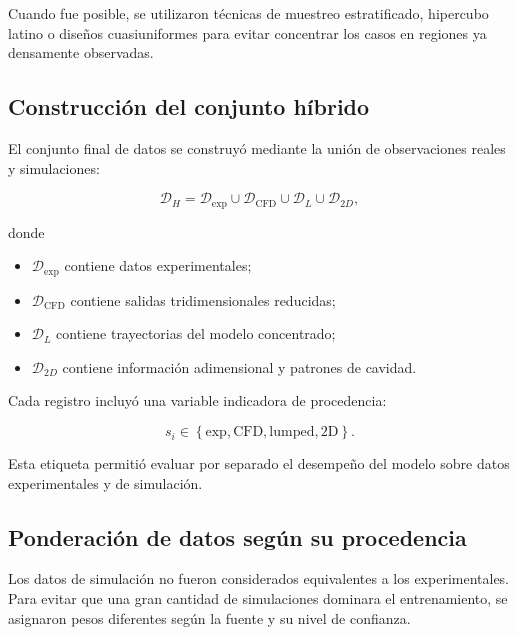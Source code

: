Cuando fue posible, se utilizaron técnicas de muestreo estratificado, hipercubo latino o diseños cuasiuniformes para evitar concentrar los casos en regiones ya densamente observadas.

\subsection{Construcción del conjunto híbrido}
\label{subsec:conjunto_hibrido}

El conjunto final de datos se construyó mediante la unión de observaciones reales y simulaciones:

\begin{equation}
\mathcal{D}_{H}
=
\mathcal{D}_{\mathrm{exp}}
\cup
\mathcal{D}_{\mathrm{CFD}}
\cup
\mathcal{D}_{L}
\cup
\mathcal{D}_{2D},
\label{eq:dataset_hibrido}
\end{equation}

donde

\begin{itemize}
    \item $\mathcal{D}_{\mathrm{exp}}$ contiene datos experimentales;
    \item $\mathcal{D}_{\mathrm{CFD}}$ contiene salidas tridimensionales reducidas;
    \item $\mathcal{D}_{L}$ contiene trayectorias del modelo concentrado;
    \item $\mathcal{D}_{2D}$ contiene información adimensional y patrones de cavidad.
\end{itemize}

Cada registro incluyó una variable indicadora de procedencia:

\begin{equation}
s_i
\in
\left\{
\mathrm{exp},
\mathrm{CFD},
\mathrm{lumped},
\mathrm{2D}
\right\}.
\label{eq:etiqueta_fuente}
\end{equation}

Esta etiqueta permitió evaluar por separado el desempeño del modelo sobre datos experimentales y de simulación.

\subsection{Ponderación de datos según su procedencia}
\label{subsec:ponderacion_fuentes}

Los datos de simulación no fueron considerados equivalentes a los experimentales. Para evitar que una gran cantidad de simulaciones dominara el entrenamiento, se asignaron pesos diferentes según la fuente y su nivel de confianza.

